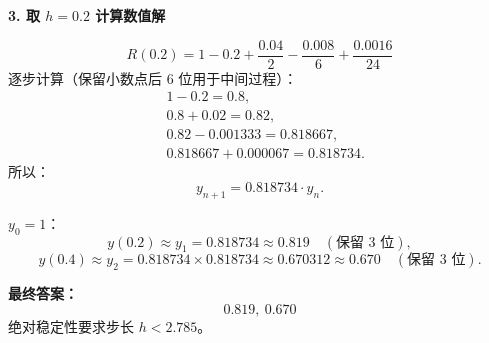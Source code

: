 \documentclass[lang=cn,newtx,12pt,scheme=chinese]{elegantbook}
\begin{document}
\begin{solution}
	\noindent\textbf{3. 取 $h=0.2$ 计算数值解}
	
	\[
	R(0.2) = 1 - 0.2 + \frac{0.04}{2} - \frac{0.008}{6} + \frac{0.0016}{24}
	\]
	逐步计算（保留小数点后 6 位用于中间过程）：
	\[
	\begin{aligned}
		&1 - 0.2 = 0.8, \\
		&0.8 + 0.02 = 0.82, \\
		&0.82 - 0.001333 = 0.818667, \\
		&0.818667 + 0.000067 = 0.818734.
	\end{aligned}
	\]
	所以：
	\[
	y_{n+1} = 0.818734 \cdot y_n.
	\]
	
	$y_0 = 1$：
	\[
	y(0.2) \approx y_1 = 0.818734 \approx 0.819 \quad (\text{保留 3 位}),
	\]
	\[
	y(0.4) \approx y_2 = 0.818734 \times 0.818734 \approx 0.670312 \approx 0.670 \quad (\text{保留 3 位}).
	\]
	
	\noindent\textbf{最终答案：}
	\[
	\boxed{0.819, \ 0.670}
	\]
	绝对稳定性要求步长 $h < 2.785$。
\end{solution}
\end{document}
